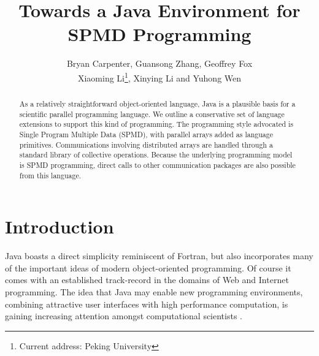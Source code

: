 





\title{Towards a Java Environment for SPMD Programming}

\author{Bryan Carpenter, Guansong Zhang, Geoffrey Fox \\
        Xiaoming Li\thanks{Current address: Peking University},
        Xinying Li and Yuhong Wen}


\maketitle

\begin{abstract}
As a relatively straightforward object-oriented language, Java is
a plausible basis for a scientific parallel programming
language.  We outline a conservative set of language extensions to
support this kind of programming.  The programming style advocated is
Single Program Multiple Data (SPMD), with parallel arrays added as
language primitives.  Communications involving distributed arrays are
handled through a standard library of collective operations.  Because
the underlying programming model is SPMD programming, direct calls to
other communication packages are also possible from this language.
\end{abstract}


\section{Introduction}

Java boasts a direct simplicity reminiscent of Fortran, but also
incorporates many of the important ideas of modern object-oriented
programming.  Of course it comes with an established track-record in
the domains of Web and Internet programming.  The idea that Java may
enable new programming environments, combining attractive user
interfaces with high performance computation, is gaining increasing
attention amongst computational scientists
\cite{Java_for_CSE,Java_for_CSE_II}.


